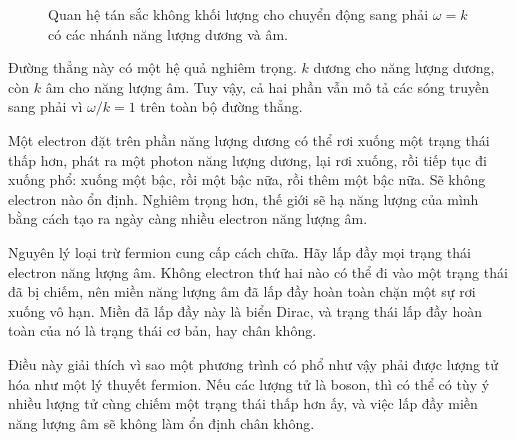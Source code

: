 \begin{figure}[htbp]
\centering
{}
\caption{Quan hệ tán sắc không khối lượng cho chuyển động sang phải \(\omega=k\) có các nhánh năng lượng dương và âm.}
\end{figure}

Đường thẳng này có một hệ quả nghiêm trọng. \(k\) dương cho năng lượng dương, còn \(k\) âm cho năng lượng âm. Tuy vậy, cả hai phần vẫn mô tả các sóng truyền sang phải vì \(\omega/k=1\) trên toàn bộ đường thẳng.

Một electron đặt trên phần năng lượng dương có thể rơi xuống một trạng thái thấp hơn, phát ra một photon năng lượng dương, lại rơi xuống, rồi tiếp tục đi xuống phổ: xuống một bậc, rồi một bậc nữa, rồi thêm một bậc nữa. Sẽ không electron nào ổn định. Nghiêm trọng hơn, thế giới sẽ hạ năng lượng của mình bằng cách tạo ra ngày càng nhiều electron năng lượng âm.

Nguyên lý loại trừ fermion cung cấp cách chữa. Hãy lấp đầy mọi trạng thái electron năng lượng âm. Không electron thứ hai nào có thể đi vào một trạng thái đã bị chiếm, nên miền năng lượng âm đã lấp đầy hoàn toàn chặn một sự rơi xuống vô hạn. Miền đã lấp đầy này là biển Dirac, và trạng thái lấp đầy hoàn toàn của nó là trạng thái cơ bản, hay chân không.

\begin{classroomqa}
\end{classroomqa}

Điều này giải thích vì sao một phương trình có phổ như vậy phải được lượng tử hóa như một lý thuyết fermion. Nếu các lượng tử là boson, thì có thể có tùy ý nhiều lượng tử cùng chiếm một trạng thái thấp hơn ấy, và việc lấp đầy miền năng lượng âm sẽ không làm ổn định chân không.

